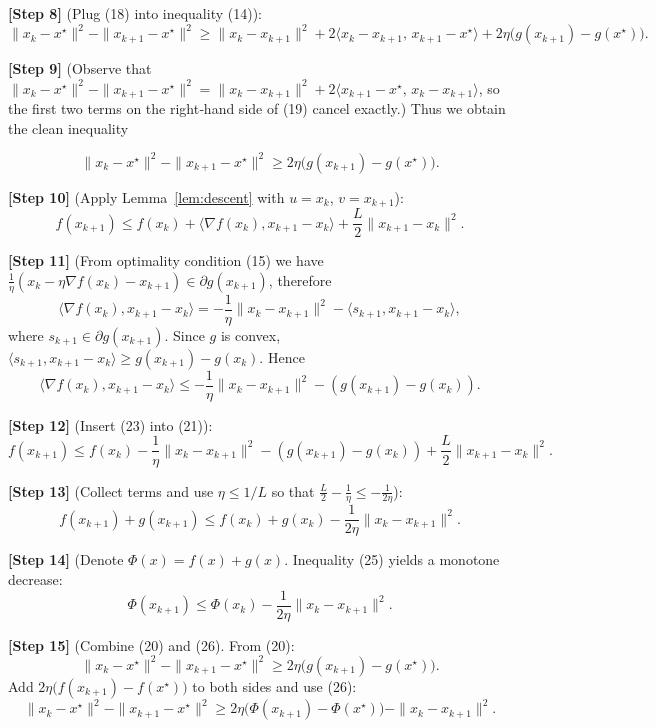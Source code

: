 \documentclass{article}
\begin{document}
\noindent\textbf{[Step 8]} (Plug (18) into inequality (14)):
\[
\|x_{k}-x^{\star}\|^{2}
-\|x_{k+1}-x^{\star}\|^{2}
\ge \|x_{k}-x_{k+1}\|^{2}
+2\bigl\langle x_{k}-x_{k+1},\,x_{k+1}-x^{\star}\bigr\rangle
+2\eta\bigl(g(x_{k+1})-g(x^{\star})\bigr).
\tag{19}
\]

\noindent\textbf{[Step 9]} (Observe that
$\|x_{k}-x^{\star}\|^{2}
-\|x_{k+1}-x^{\star}\|^{2}
= \|x_{k}-x_{k+1}\|^{2}
+2\langle x_{k+1}-x^{\star},\,x_{k}-x_{k+1}\rangle$,
so the first two terms on the right‑hand side of (19) cancel exactly.)
Thus we obtain the clean inequality  

\[
\|x_{k}-x^{\star}\|^{2}
-\|x_{k+1}-x^{\star}\|^{2}
\ge 2\eta\bigl(g(x_{k+1})-g(x^{\star})\bigr).
\tag{20}
\]

\noindent\textbf{[Step 10]} (Apply Lemma~\ref{lem:descent} with $u=x_{k}$, $v=x_{k+1}$):
\[
f(x_{k+1})\le f(x_{k})+\langle\nabla f(x_{k}),x_{k+1}-x_{k}\rangle
+\frac{L}{2}\|x_{k+1}-x_{k}\|^{2}.
\tag{21}
\]

\noindent\textbf{[Step 11]} (From optimality condition (15) we have 
$\frac{1}{\eta}(x_{k}-\eta\nabla f(x_{k})-x_{k+1})\in\partial g(x_{k+1})$, therefore
\[
\langle\nabla f(x_{k}),x_{k+1}-x_{k}\rangle
=-\frac{1}{\eta}\|x_{k}-x_{k+1}\|^{2}
-\langle s_{k+1},x_{k+1}-x_{k}\rangle,
\tag{22}
\]
where $s_{k+1}\in\partial g(x_{k+1})$.
Since $g$ is convex,
$\langle s_{k+1},x_{k+1}-x_{k}\rangle\ge g(x_{k+1})-g(x_{k})$.
Hence
\[
\langle\nabla f(x_{k}),x_{k+1}-x_{k}\rangle
\le -\frac{1}{\eta}\|x_{k}-x_{k+1}\|^{2}
-(g(x_{k+1})-g(x_{k})).
\tag{23}
\]

\noindent\textbf{[Step 12]} (Insert (23) into (21)):
\[
f(x_{k+1})\le f(x_{k})
-\frac{1}{\eta}\|x_{k}-x_{k+1}\|^{2}
-(g(x_{k+1})-g(x_{k}))
+\frac{L}{2}\|x_{k+1}-x_{k}\|^{2}.
\tag{24}
\]

\noindent\textbf{[Step 13]} (Collect terms and use $\eta\le 1/L$ so that
$\frac{L}{2}-\frac{1}{\eta}\le -\frac{1}{2\eta}$):
\[
f(x_{k+1})+g(x_{k+1})
\le f(x_{k})+g(x_{k})
-\frac{1}{2\eta}\|x_{k}-x_{k+1}\|^{2}.
\tag{25}
\]

\noindent\textbf{[Step 14]} (Denote $\Phi(x)=f(x)+g(x)$. Inequality (25) yields a monotone decrease:
\[
\Phi(x_{k+1})\le\Phi(x_{k})-\frac{1}{2\eta}\|x_{k}-x_{k+1}\|^{2}.
\tag{26}
\]

\noindent\textbf{[Step 15]} (Combine (20) and (26). From (20):
\[
\|x_{k}-x^{\star}\|^{2}
-\|x_{k+1}-x^{\star}\|^{2}
\ge 2\eta\bigl(g(x_{k+1})-g(x^{\star})\bigr).
\tag{27}
\]
Add $2\eta\bigl(f(x_{k+1})-f(x^{\star})\bigr)$ to both sides and use (26):
\[
\|x_{k}-x^{\star}\|^{2}
-\|x_{k+1}-x^{\star}\|^{2}
\ge 2\eta\bigl(\Phi(x_{k+1})-\Phi(x^{\star})\bigr)
-\|x_{k}-x_{k+1}\|^{2}.
\tag{28}
\]
\end{document}
